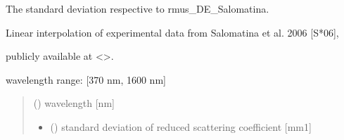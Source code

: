 \documentclass[letterpaper,10pt,english]{sphinxmanual}
\begin{document}
\begin{fulllineitems}
\label{\detokenize{04_scattering_coefficient:skinoptics.scattering_coefficient.std_rmus_DE_Salomatina}}
\pysigstartsignatures
{}
\pysigstopsignatures
\begin{DUlineblock}{0em}
\item[] The standard deviation respective to rmus\_DE\_Salomatina.
\item[] Linear interpolation of experimental data from Salomatina et al. 2006 {[}S*06{]},
\item[] publicly available at \textless{}\textgreater{}.
\end{DUlineblock}

\begin{DUlineblock}{0em}
\item[] wavelength range: {[}370 nm, 1600 nm{]}
\end{DUlineblock}
\begin{quote}\begin{description}
\sphinxAtStartPar
{} () \textendash{} wavelength {[}nm{]}

\sphinxAtStartPar
\begin{itemize}
\item {} 
\sphinxAtStartPar
{} () \textendash{} standard deviation of reduced scattering coefficient {[}mm\sphinxhyphen{}1{]}

\end{itemize}


\end{description}\end{quote}

\end{fulllineitems}

\end{document}
